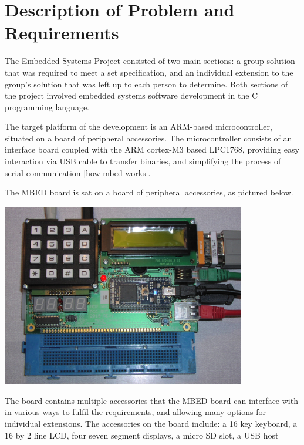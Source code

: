 \section{Description of Problem and Requirements}

The Embedded Systems Project consisted of two main sections: a group solution 
that was required to meet a set specification, and an individual extension to 
the group's solution that was left up to each person to determine. 
Both sections of the project involved embedded systems software development in 
the C programming language. 
\par\bigskip\noindent
The target platform of the development is an ARM-based microcontroller, 
situated on a board of peripheral accessories. The microcontroller consists of 
an interface board coupled with the ARM cortex-M3 based LPC1768, providing easy 
interaction via USB cable to transfer binaries, and simplifying the process of 
serial communication [how-mbed-works].
\par\bigskip\noindent
The MBED board is sat on a board of peripheral accessories, as pictured below. 
\par\bigskip
\includegraphics[width=0.80\textwidth]{./mbed_board}
\par\bigskip\noindent
The board contains multiple accessories that the MBED board can interface with 
in various ways to fulfil the requirements, and allowing many options for 
individual extensions. The accessories on the board include: a 16 key keyboard, 
a 16 by 2 line LCD, four seven segment displays, a micro SD slot, a USB host 
